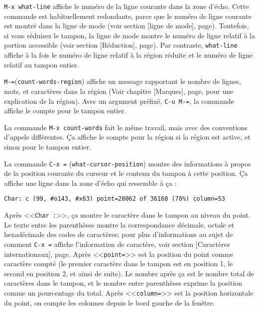 \texttt{M-x what-line} affiche le numéro de la ligne courante dans la
zone d'écho. Cette commande est habituellement redondante, parce que
le numéro de ligne courante est montré dans la ligne de mode (voir
section [ligne de mode], page). Toutefois, si
vous réduisez le tampon, la ligne de mode montre le numéro de ligne
relatif à la portion accessible (voir section
[Réduction], page). Par contraste, \texttt{what-line}
affiche à la fois le numéro de ligne relatif à la région réduite et le
numéro de ligne relatif au tampon entier. \par

\texttt{M-=}(\texttt{count-words-region}) affiche un message
rapportant le nombre de lignes, mots, et caractères dans la région (Voir
  chapitre [Marques], page, pour une explication de
  la région). Avec un argument préfixé, \texttt{C-u M-=}, la commande
  affiche le compte pour le tampon entier.\par

La commande \texttt{M-x count-words} fait le même travail, mais avec
des conventions d'appels différentes. \c{C}a affiche le compte pour la
région si la région est active, et sinon pour le tampon entier. \par

La commande \texttt{C-x =} (\texttt{what-cursor-position}) montre des
informations à propos de la position courante du curseur et le contenu
du tampon à cette position. \c{C}a affiche une ligne dans la zone
d'écho qui ressemble à \c{c}a :
\begin{center}
  \texttt{Char: c (99, \#o143, \#x63) point=28062 of 36168 (78\%) column=53}
\end{center}
Après <<\texttt{Char :}>>, \c{c}a montre le caractère dans le tampon
au niveau du point. Le texte entre les parenthèses montre la
correspondance décimale, octale et hexadécimale des codes de
caractères; pour plus d'informations au sujet de comment \texttt{C-x
  =} affiche l'information de caractère, voir section
[Caractères internationaux], page. Après
<<\texttt{point=}>> est la position du point comme caractère compté
(le premier caractère dans le tampon est en position 1, le second en
position 2, et ainsi de suite). Le nombre après \c{c}a est le nombre
total de caractères dans le tampon, et le nombre entre parenthèses
exprime la position comme un pourcentage du total. Après
<<\texttt{column=}>> est la position horizontale du point, on compte
les colonnes depuis le bord gauche de la fenêtre.\par

